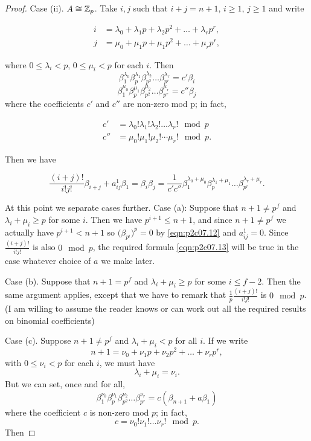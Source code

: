 \documentclass[../main]{subfiles}
\begin{document}
\begin{proof}
Case (ii). $A \cong \mathbb{Z}_p$. Take $i, j$ such that $i + j = n + 1$, $i \ge 1$, $j \ge 1$ and write 

\begin{align*}
i & = \lambda_0 + \lambda_1 p + \lambda_2 p^2 + \ldots + \lambda_r p^r, \\ j & = \mu_0 + \mu_1 p + \mu_1 p^2 + \ldots + \mu_r p^r,
\end{align*}

where $0 \le \lambda_i < p$, $0 \le \mu_i < p$ for each $i$. Then \[\beta_1^{\lambda_0} \beta_p^{\lambda_1} \beta_{p^2}^{\lambda_2} \ldots \beta_{p^r}^{\lambda_r} = c'\beta_i\] \[\beta_1^{\mu_0} \beta_p^{\mu_1} \beta_{p^2}^{\mu_2} \ldots \beta_{p^r}^{\mu_r} = c''\beta_j\] where the coefficients $c'$ and $c''$ are non-zero mod p; in fact,

\begin{align*}
c' & = \lambda_0! \lambda_1! \lambda_2! \ldots \lambda_r! \mod p \\ c'' & = \mu_0! \mu_1! \mu_2! \cdots \mu_r! \mod p.
\end{align*}

Then we have 

\[\frac {(i + j)!} {i! j!} \beta_{i + j} + a_{ij}^1 \beta_1 = \beta_i \beta_j = \frac 1 {c' c''} \beta_1^{\lambda_0 + \mu_0} \beta_p^{\lambda_1 + \mu_1} \ldots \beta_{p^r}^{\lambda_r + \mu_r}.\] 

At this point we separate cases further.
Case (a): Suppose that $n + 1 \ne p^f$ and $\lambda_i + \mu_i \ge p$ for some $i$. Then we have $p^{i + 1} \le n + 1$, and since $n + 1 \ne p^f$ we actually have $p^{i + 1} < n + 1$ so $\big(\beta_{p^i}\big)^p = 0$ by \eqref{eqn:p2c07.12} and $a_{ij}^1 = 0$. Since $\displaystyle \frac {(i + j)!} {i! j!}$ is also $0 \mod p$, the required formula \eqref{eqn:p2c07.13} will be true in the case whatever choice of $a$ we make later.

Case (b). Suppose that $n + 1 = p^f$ and $\lambda_i + \mu_i \ge p$ for some $i \le f - 2$. Then the same argument applies, except that we have to remark that $\displaystyle \frac 1 p \frac {(i + j)!} {i! j!}$ is $0 \mod p$. (I am willing to assume the reader knows or can work out all the required results on binomial coefficients)

Case (c). Suppose $n + 1 \ne p^f$ and $\lambda_i + \mu_i < p$ for all $i$. If we write \[n + 1 = \nu_0 + \nu_1 p + \nu_2 p^2 + \ldots + \nu_r p^r,\] with $0 \le \nu_i < p$ for each $i$, we must have \[\lambda_i + \mu_i = \nu_i.\] But we can set, once and for all, \[\beta_1^{\nu_0} \beta_p^{\nu_1} \beta_{p^2}^{\nu_2} \ldots \beta_{p^r}^{\nu_r} = c(\beta_{n + 1} + a \beta_1)\] where the coefficient $c$ is non-zero mod $p$; in fact, \[c = \nu_0! \nu_1! \ldots \nu_r! \mod p.\] Then


\end{proof}
\end{document}
